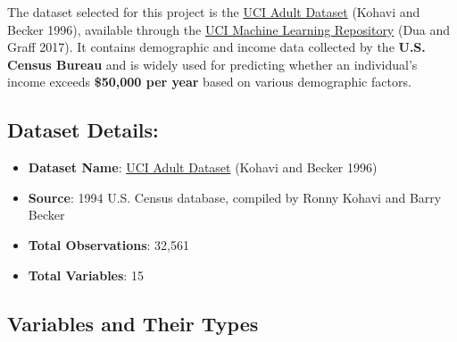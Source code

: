 \documentclass[
  letterpaper,
  DIV=11,
  numbers=noendperiod]{scrartcl}
\providecommand{\tightlist}{%
  \setlength{\itemsep}{0pt}\setlength{\parskip}{0pt}}\usepackage{longtable,booktabs,array}
\begin{document}
The dataset selected for this project is the
\href{https://archive.ics.uci.edu/dataset/2/adult}{UCI Adult Dataset}
(Kohavi and Becker 1996), available through the
\href{https://archive.ics.uci.edu/ml}{UCI Machine Learning Repository}
(Dua and Graff 2017). It contains demographic and income data collected
by the \textbf{U.S. Census Bureau} and is widely used for predicting
whether an individual's income exceeds \textbf{\$50,000 per year} based
on various demographic factors.

\hypertarget{dataset-details}{%
\subsection{Dataset Details:}\label{dataset-details}}

\begin{itemize}
\tightlist
\item
  \textbf{Dataset Name}:
  \href{https://archive.ics.uci.edu/dataset/2/adult}{UCI Adult Dataset}
  (Kohavi and Becker 1996)
\item
  \textbf{Source}: 1994 U.S. Census database, compiled by Ronny Kohavi
  and Barry Becker\\
\item
  \textbf{Total Observations}: 32,561
\item
  \textbf{Total Variables}: 15
\end{itemize}

\hypertarget{variables-and-their-types}{%
\subsection{Variables and Their Types}\label{variables-and-their-types}}
\end{document}
